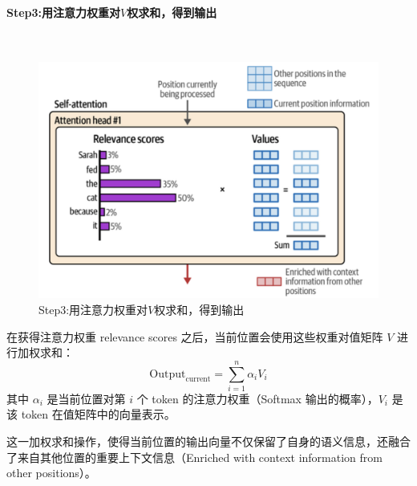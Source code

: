 


\clearpage

\paragraph{Step3:用注意力权重对$𝑉$权求和，得到输出}~{}
\begin{figure}[htbp]
  \centering
  \includegraphics[width=0.8\linewidth]{figs/lec2/lec2.15.png}
  \caption{Step3:用注意力权重对$𝑉$权求和，得到输出}
\label{fig:Step3:用注意力权重对$𝑉$权求和，得到输出}
\end{figure}

在获得注意力权重  {\color{qpurple}relevance scores} 之后，当前位置会使用这些权重对值矩阵 $V$ 进行加权求和：  
\[
\text{Output}_{\text{current}} = \sum_{i=1}^{n} \alpha_i V_i
\]
其中 $\alpha_i$ 是当前位置对第 $i$ 个 token 的注意力权重（Softmax 输出的概率），$V_i$ 是该 token 在值矩阵中的向量表示。  

这一加权求和操作，使得当前位置的输出向量不仅保留了自身的语义信息，还融合了来自其他位置的重要上下文信息（{\color{tred}Enriched with context information from other positions}）。  

